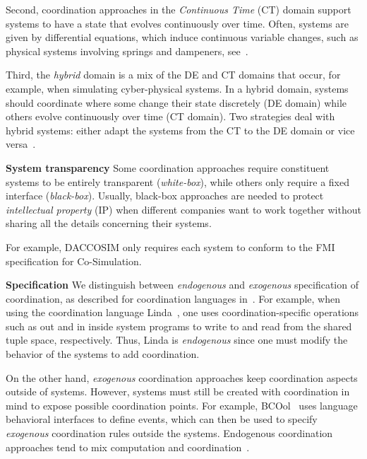 \documentclass[runningheads]{llncs}
\newcommand{\feature}[1]{\textbf{#1}}
\begin{document}
Second, coordination approaches in the \textit{Continuous Time} (CT) domain support systems to have a state that evolves continuously over time.
Often, systems are given by differential equations, which induce continuous variable changes, such as physical systems involving springs and dampeners, see~\cite{gomesCoSimulationSurvey2019}.

Third, the \textit{hybrid} domain is a mix of the DE and CT domains that occur, for example, when simulating cyber-physical systems.
In a hybrid domain, systems should coordinate where some change their state discretely (DE domain) while others evolve continuously over time (CT domain).
Two strategies deal with hybrid systems: either adapt the systems from the CT to the DE domain or vice versa~\cite{gomesCoSimulationSurvey2019}.

\feature{System transparency} Some coordination approaches require constituent systems to be entirely transparent (\textit{white-box}), while others only require a fixed interface (\textit{black-box}).
Usually, black-box approaches are needed to protect \textit{intellectual property} (IP) when different companies want to work together without sharing all the details concerning their systems.

For example, DACCOSIM only requires each system to conform to the FMI specification for Co-Simulation.

\feature{Specification} We distinguish between \textit{endogenous} and \textit{exogenous} specification of coordination, as described for coordination languages in~\cite{arbabWhatYouMean1998}.
For example, when using the coordination language Linda~\cite{carrieroLindaContext1989}, one uses coordination-specific operations such as \textsf{out} and \textsf{in} inside system programs to write to and read from the shared tuple space, respectively.
Thus, Linda is \textit{endogenous} since one must modify the behavior of the systems to add coordination.

On the other hand, \textit{exogenous} coordination approaches keep coordination aspects outside of systems.
However, systems must still be created with coordination in mind to expose possible coordination points.
For example, BCOol~\cite{varalarsenBehavioralCoordinationOperator2015} uses language behavioral interfaces to define events, which can then be used to specify \textit{exogenous} coordination rules outside the systems.
Endogenous coordination approaches tend to mix computation and coordination~\cite{arbabWhatYouMean1998}.
\end{document}
